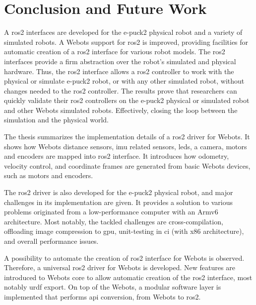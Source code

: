 \chapter{Conclusion and Future Work}
\label{chap:conclusion}

A \ac{ros2} interfaces are developed for the e-puck2 physical robot and a variety of simulated robots.
A Webots support for \ac{ros2} is improved, providing facilities for automatic creation of a \ac{ros2} interface for various robot models.
The \ac{ros2} interfaces provide a firm abstraction over the robot's simulated and physical hardware. 
Thus, the \ac{ros2} interface allows a \ac{ros2} controller to work with the physical or simulate e-puck2 robot, or with any other simulated robot, without changes needed to the \ac{ros2} controller.
The results prove that researchers can quickly validate their \ac{ros2} controllers on the e-puck2 physical or simulated robot and other Webots simulated robots.
Effectively, closing the loop between the simulation and the physical world.

The thesis summarizes the implementation details of a \ac{ros2} driver for Webots.
It shows how Webots distance sensors, \ac{imu} related sensors, \acp{led}, a camera, motors and encoders are mapped into \ac{ros2} interface.
It introduces how odometry, velocity control, and coordinate frames are generated from basic Webots devices, such as motors and encoders.

The \ac{ros2} driver is also developed for the e-puck2 physical robot, and major challenges in its implementation are given.
It provides a solution to various problems originated from a low-performance computer with an Armv6 architecture. 
Most notably, the tackled challenges are cross-compilation, offloading image compression to \ac{gpu}, unit-testing in \ac{ci} (with x86 architecture), and overall performance issues.

A possibility to automate the creation of \ac{ros2} interface for Webots is observed.
Therefore, a universal \ac{ros2} driver for Webots is developed.
New features are introduced to Webots core to allow automatic creation of the \ac{ros2} interface, most notably \ac{urdf} export.
On top of the Webots, a modular software layer is implemented that performs \ac{api} conversion, from Webots to \ac{ros2}.

